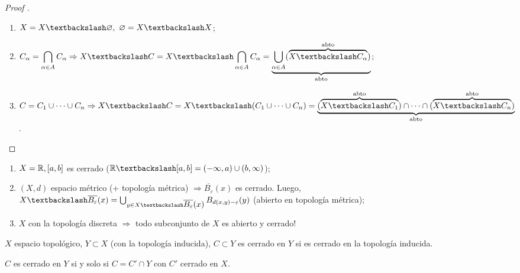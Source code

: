 \documentclass[a4paper]{report}
\begin{document}
	\begin{proof}[Proof ]
		\text{}
		\begin{enumerate}
			\item $X = X \textbackslash \varnothing, \text{ } \varnothing = X \textbackslash X$;

			\item $C_{\alpha} = \displaystyle\bigcap_{\alpha \in A} C_{\alpha} \Rightarrow X \textbackslash C = X \textbackslash \displaystyle\bigcap_{\alpha \in A} C_{\alpha} = \underbrace{\displaystyle\bigcup_{\alpha \in A} (\overbrace{X \textbackslash C_{\alpha}}^{\text{abto}})}_{\text{abto}}$;

			\item $C = C_1 \cup \cdots \cup C_n \Rightarrow X \textbackslash C = X \textbackslash (C_1 \cup \cdots \cup C_n) = \underbrace{(\overbrace{X \textbackslash C_1}^{\text{abto}}) \cap \cdots \cap (\overbrace{X \textbackslash C_n}^{\textrm{abto}})}_{\text{abto}}$.
		\end{enumerate}
	\end{proof}

	\begin{eg}
		\text{}
		\begin{enumerate}
			\item $X = \mathbb{R}, [a,b]$ es cerrado ($\R \textbackslash [a,b] = (-\infty, a) \cup (b, \infty)$);

			\item $(X,d)$ espacio métrico (+ topología métrica) $\Rightarrow \overline{B_{\varepsilon}} (x)$ es cerrado. Luego, $X \textbackslash \overline{B_{\varepsilon}} (x) = \bigcup_{y \in X \textbackslash \displaystyle\overline{B_{\varepsilon}} (x)} B_{d(x,y)-\varepsilon} (y)$ (abierto en topología métrica);

			\item $X$ con la topología discreta $\Rightarrow$ todo subconjunto de $X$ es abierto y cerrado!
		\end{enumerate}
	\end{eg}

	\begin{definition}
		$X$ espacio topológico, $Y \subset X$ (con la topología inducida), $C \subset Y$ es cerrado en $Y$ si es cerrado en la topología inducida.
	\end{definition}

	\begin{lemma}
		$C$ es cerrado en $Y$ si y solo si $C = C' \cap Y$ con $C'$ cerrado en $X$.
	\end{lemma}
\end{document}
